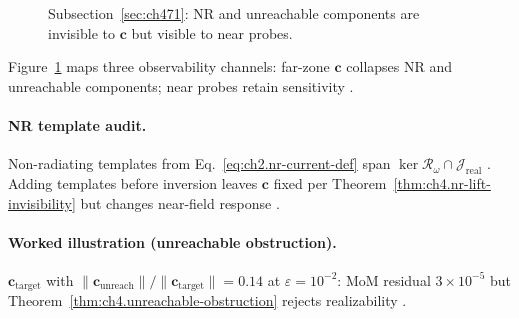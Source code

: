 \begin{figure}[t]
\centering
{}
\caption{Subsection~\ref{sec:ch471}: NR and unreachable components are invisible to \(\mathbf{c}\) but visible to near probes.}
\label{fig:ch4.nr-unreachable-split}
\end{figure}

Figure~\ref{fig:ch4.nr-unreachable-split} maps three observability channels: far-zone \(\mathbf{c}\) collapses NR and unreachable components; near probes
retain sensitivity \cite{stratton1941,harrington2001,devaney2004}.

\paragraph{NR template audit.}
Non-radiating templates from Eq.~\eqref{eq:ch2.nr-current-def} span \(\ker\mathcal{R}_\omega\cap\mathcal{J}_{\mathrm{real}}\)
\cite{stratton1941,harrington2001}. Adding templates before inversion leaves \(\mathbf{c}\) fixed per Theorem~\ref{thm:ch4.nr-lift-invisibility} but
changes near-field response \cite{devaney2004,hansen1988}.

\paragraph{Worked illustration (unreachable obstruction).}
\(\mathbf{c}_{\mathrm{target}}\) with \(\|\mathbf{c}_{\mathrm{unreach}}\|/\|\mathbf{c}_{\mathrm{target}}\|=0.14\) at \(\varepsilon=10^{-2}\): MoM residual
\(3\times10^{-5}\) but Theorem~\ref{thm:ch4.unreachable-obstruction} rejects realizability \cite{harrington2001,devaney2004,stratton1941,hansen1988}.

